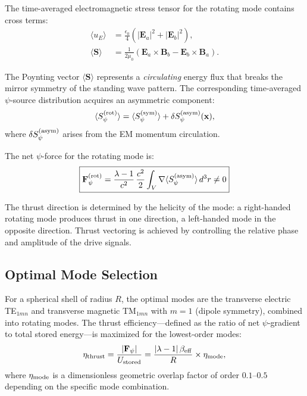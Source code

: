 \documentclass[twocolumn,prl,superscriptaddress,nofootinbib,longbibliography,floatfix]{revtex4-2}
\newcommand{\lam}{\lambda}
\begin{document}
The time-averaged electromagnetic stress tensor for the rotating mode
contains cross terms:
\begin{align}
\langle u_E \rangle &= \frac{\epsilon_0}{4}
\left(|\mathbf{E}_a|^2 + |\mathbf{E}_b|^2\right),
\label{eq:rot-uE}\\
\langle \mathbf{S} \rangle &=
\frac{1}{2\mu_0}\left(\mathbf{E}_a \times \mathbf{B}_b
- \mathbf{E}_b \times \mathbf{B}_a\right).
\label{eq:rot-poynting}
\end{align}

The Poynting vector $\langle \mathbf{S} \rangle$ represents a
\emph{circulating} energy flux that breaks the mirror symmetry of the
standing wave pattern.  The corresponding time-averaged $\psi$-source
distribution acquires an asymmetric component:
\begin{equation}
\langle S_\psi^{\rm (rot)} \rangle =
\langle S_\psi^{\rm (sym)} \rangle
+ \delta S_\psi^{\rm (asym)}(\mathbf{x}),
\label{eq:rot-source}
\end{equation}
where $\delta S_\psi^{\rm (asym)}$ arises from the EM momentum
circulation.

The net $\psi$-force for the rotating mode is:
\begin{equation}
\boxed{
\mathbf{F}_\psi^{\rm (rot)} =
\frac{\lam - 1}{c^2}\,\frac{c^2}{2}
\int_V \nabla\langle S_\psi^{\rm (asym)} \rangle\,d^3r
\neq 0
}
\label{eq:rot-thrust}
\end{equation}

The thrust direction is determined by the helicity of the mode: a
right-handed rotating mode produces thrust in one direction, a
left-handed mode in the opposite direction.  Thrust vectoring is
achieved by controlling the relative phase and amplitude of the drive
signals.

\subsection{Optimal Mode Selection}

For a spherical shell of radius $R$, the optimal modes are the
transverse electric TE$_{1mn}$ and transverse magnetic TM$_{1mn}$ with
$m = 1$ (dipole symmetry), combined into rotating modes.  The thrust
efficiency---defined as the ratio of net $\psi$-gradient to total
stored energy---is maximized for the lowest-order modes:
\begin{equation}
\eta_{\rm thrust} =
\frac{|\mathbf{F}_\psi|}{U_{\rm stored}}
= \frac{|\lam - 1|\,\beta_{\rm eff}}{R}
\times \eta_{\rm mode},
\label{eq:thrust-efficiency}
\end{equation}
where $\eta_{\rm mode}$ is a dimensionless geometric overlap factor
of order $0.1$--$0.5$ depending on the specific mode combination.
\end{document}
